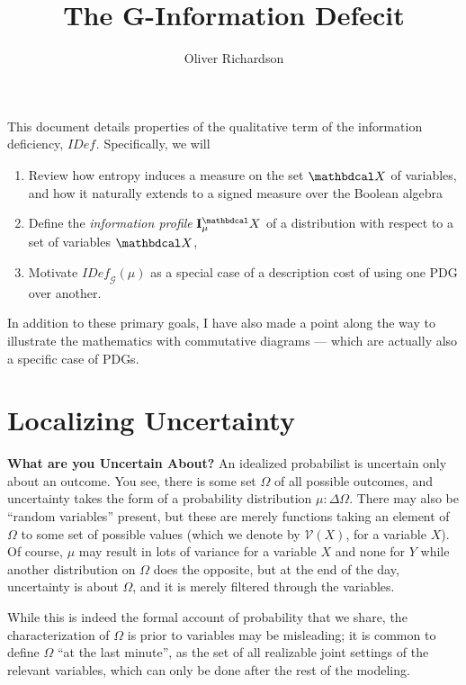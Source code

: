 \documentclass{article}
\title{The G-Information Defecit}
\author{Oliver Richardson}
\theoremstyle{plain}
\theoremstyle{definition}
\theoremstyle{remark}
\newcommand{\V}{\mathcal V}
\newcommand{\N}{\mathbdcal X}
\newcommand{\IDef}[1]{\mathit{IDef}_{\!#1}}
\newcommand{\Gr}{\mathcal G}
\begin{document}
	\maketitle
	
	This document details properties of the qualitative term of the information deficiency, $\IDef{}$. 
		Specifically, we will
	\begin{enumerate}[nosep]
		\item Review how entropy induces a measure on the set $\N$ of variables, and how it naturally extends to a signed measure over the Boolean algebra 
		
		\item Define the \emph{information profile} $\mathbf{I}_\mu^\N$ of a distribution with respect to a set of variables $\N$, 
		\item Motivate $\IDef{\Gr}(\mu)$ as a special case of a description cost of using one PDG over another. 
	\end{enumerate}
	
	In addition to these primary goals, I have also made a point along the way to illustrate the mathematics with commutative diagrams --- which are actually also a specific case of PDGs.

	\section{Localizing Uncertainty}
	\textbf{What are you Uncertain About?}
	An idealized probabilist is uncertain only about an outcome. You see, there is some set $\Omega$ of all possible outcomes, and uncertainty takes the form of a probability distribution $\mu : \Delta\Omega$. There may also be ``random variables'' present, but these are merely functions taking an element of $\Omega$ to some set of possible values (which we denote by $\V(X)$, for a variable $X$).
	Of course, $\mu$ may result in lots of variance for a variable $X$ and none for $Y$ while another distribution on $\Omega$ does the opposite, 
	but at the end of the day, uncertainty is about $\Omega$, and it is merely filtered through the variables. 
	
	While this is indeed the formal account of probability that we share, the characterization of $\Omega$ is prior to variables may be misleading; it is common to define $\Omega$ ``at the last minute'', as the set of all realizable joint settings of the relevant variables, which can only be done after the rest of the modeling.  
	
\end{document}
